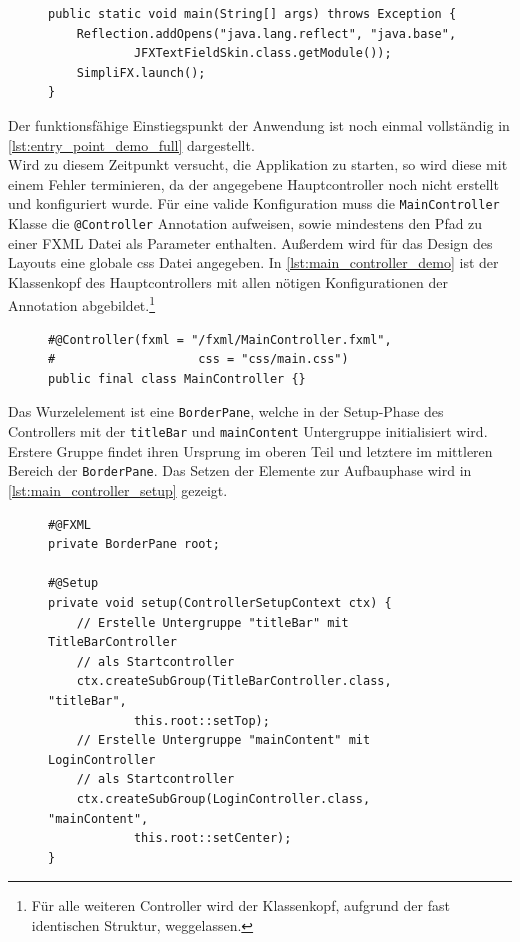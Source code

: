 \begin{figure}[H]
\begin{lstlisting}[caption=Demo -- \texttt{main} Methode., captionpos=b, label=lst:main_method_demo]
public static void main(String[] args) throws Exception {
    Reflection.addOpens("java.lang.reflect", "java.base",
			JFXTextFieldSkin.class.getModule());
    SimpliFX.launch();
}
	\end{lstlisting}
\end{figure}
\noindent Der funktionsfähige Einstiegspunkt der Anwendung ist noch einmal vollständig in \autoref{lst:entry_point_demo_full} dargestellt.\\
Wird zu diesem Zeitpunkt versucht, die Applikation zu starten, so wird diese mit einem Fehler terminieren, da der angegebene Hauptcontroller noch nicht erstellt und konfiguriert wurde.
Für eine valide Konfiguration muss die \texttt{MainController} Klasse die \texttt{@Controller} Annotation aufweisen, sowie mindestens den Pfad zu einer FXML Datei als Parameter enthalten. Außerdem wird für das Design des Layouts eine globale \ac{css} Datei angegeben. In \autoref{lst:main_controller_demo} ist der Klassenkopf des Hauptcontrollers mit allen nötigen Konfigurationen der Annotation abgebildet.\footnote{Für alle weiteren Controller wird der Klassenkopf, aufgrund der fast identischen Struktur, weggelassen.}
\begin{figure}[H]
	\begin{lstlisting}[caption=Demo -- \texttt{MainController} Klassenkopf., captionpos=b, label=lst:main_controller_demo]
#@Controller(fxml = "/fxml/MainController.fxml", 
#					 css = "css/main.css")
public final class MainController {}
	\end{lstlisting}
\end{figure}
\noindent Das Wurzelelement ist eine \texttt{BorderPane}, welche in der Setup-Phase des Controllers mit der \texttt{titleBar} und \texttt{mainContent} Untergruppe initialisiert wird. Erstere Gruppe findet ihren Ursprung im oberen Teil und letztere im mittleren Bereich der \texttt{BorderPane}. Das Setzen der Elemente zur Aufbauphase wird in \autoref{lst:main_controller_setup} gezeigt.
\begin{figure}[H]
	\begin{lstlisting}[caption=Demo -- \texttt{MainController} Setup-Phase., captionpos=b, label=lst:main_controller_setup]
#@FXML
private BorderPane root;

#@Setup
private void setup(ControllerSetupContext ctx) {
	// Erstelle Untergruppe "titleBar" mit TitleBarController 
	// als Startcontroller
    ctx.createSubGroup(TitleBarController.class, "titleBar", 
			this.root::setTop);
	// Erstelle Untergruppe "mainContent" mit LoginController
	// als Startcontroller
    ctx.createSubGroup(LoginController.class, "mainContent",
			this.root::setCenter);
}
	\end{lstlisting}
\end{figure}

